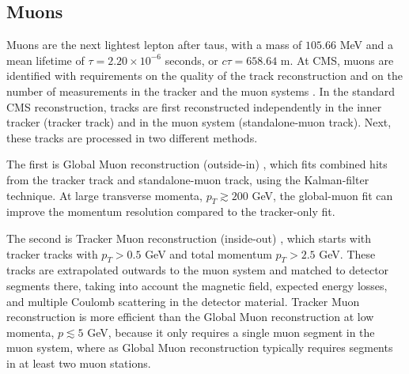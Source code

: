 \subsection{Muons}
\label{section:ch-5-muon-reconstruction}
Muons are the next lightest lepton after taus, with a mass of $105.66$ MeV and a mean lifetime of $\tau = 2.20 \times 10^{-6}$ seconds, or $c\tau = 658.64$ m. At CMS, muons are identified with requirements on the quality of the track reconstruction and on the number of measurements in the tracker and the muon systems \citep{CMS-MUO-10-004}. In the standard CMS reconstruction, tracks are first reconstructed independently in the inner tracker (tracker track) and in the muon system (standalone-muon track). Next, these tracks are processed in two different methods.

The first is Global Muon reconstruction (outside-in) \citep{CMS-MUO-10-004}, which fits combined hits from the tracker track and standalone-muon track, using the Kalman-filter technique. At large transverse momenta, $p_{T} \gtrsim 200$ GeV, the global-muon fit can improve the momentum resolution compared to the tracker-only fit. 

The second is Tracker Muon reconstruction (inside-out) \citep{CMS-MUO-10-004}, which starts with tracker tracks with $p_{T} > 0.5$ GeV and total momentum $p_{T} > 2.5$ GeV. These tracks are extrapolated outwards to the muon system and matched to detector segments there, taking into account the magnetic field, expected energy losses, and multiple Coulomb scattering in the detector material. Tracker Muon reconstruction is more efficient than the Global Muon reconstruction at low momenta, $p \lesssim 5$ GeV, because it only requires a single muon segment in the muon system, where as Global Muon reconstruction typically requires segments in at least two muon stations.


